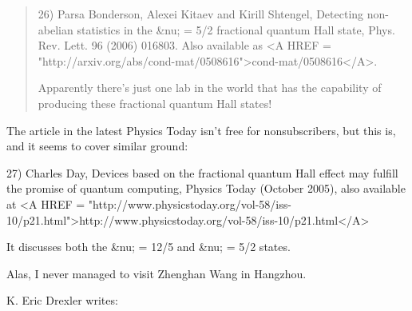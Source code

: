 \begin{quote}
26) Parsa Bonderson, Alexei Kitaev and Kirill Shtengel, Detecting
non-abelian statistics in the &nu; = 5/2 fractional quantum Hall
state, Phys. Rev. Lett. 96 (2006) 016803.  Also available as <A HREF =
"http://arxiv.org/abs/cond-mat/0508616">cond-mat/0508616</A>.

Apparently there's just one lab in the world that has the capability
of producing these fractional quantum Hall states!
\end{quote}

The article in the latest Physics Today isn't free for nonsubscribers,
but this is, and it seems to cover similar ground:

27) Charles Day, Devices based on the fractional quantum Hall effect may
fulfill the promise of quantum computing, Physics Today (October 2005),
also available at <A HREF = "http://www.physicstoday.org/vol-58/iss-10/p21.html">http://www.physicstoday.org/vol-58/iss-10/p21.html</A>

It discusses both the &nu; = 12/5 and &nu; = 5/2 states.

Alas, I never managed to visit Zhenghan Wang in Hangzhou.

K. Eric Drexler writes:

